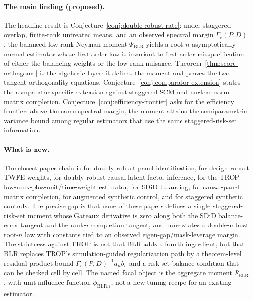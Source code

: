 \documentclass[11pt]{article}
\theoremstyle{definition}
\theoremstyle{plain}
\theoremstyle{remark}
\begin{document}
\paragraph{The main finding (proposed).}
The headline result is Conjecture~\ref{conj:double-robust-rate}: under
staggered overlap, finite-rank untreated means, and an observed spectral
margin $\Gamma_r(P,D)$, the balanced low-rank Neyman moment
$\Psi_{\mathrm{BLR}}$ yields a root-$n$ asymptotically normal estimator whose
first-order law is invariant to first-order misspecification of either the
balancing weights or the low-rank nuisance. Theorem~\ref{thm:score-orthogonal}
is the algebraic layer: it defines the moment and proves the two tangent
orthogonality equations. Conjecture~\ref{conj:comparator-extension} states the
comparator-specific extension against staggered SCM and nuclear-norm matrix
completion. Conjecture~\ref{conj:efficiency-frontier} asks for the efficiency
frontier: above the same spectral margin, the moment attains the semiparametric
variance bound among regular estimators that use the same staggered-risk-set
information.

\paragraph{What is new.}
The closest paper chain is \citet{ArkhangelskyImbens2022} for doubly robust
panel identification, \citet{ArkhangelskyImbensLeiLuo2024} for design-robust
TWFE weights, \citet{AbadieAgarwalDwivediShah2024} for doubly robust causal
latent-factor inference, \citet{AtheyImbensQuViviano2025} for the TROP
low-rank-plus-unit/time-weight estimator, \citet{ArkhangelskyAtheyHirshbergImbensWager2021}
for SDiD balancing, \citet{AtheyBayatiDoudchenkoImbensKhosravi2021} for
causal-panel matrix completion, \citet{BenMichaelFellerRothstein2021} for
augmented synthetic control, and \citet{BenMichaelFellerRothstein2022} for
staggered synthetic controls. The precise gap is that none of these papers
defines a single staggered-risk-set moment whose Gateaux derivative is zero
along both the SDiD balance-error tangent and the rank-$r$ completion tangent,
and none states a double-robust root-$n$ law with constants tied to an observed
eigen-gap/mask-leverage margin. The strictness against TROP is not that BLR
adds a fourth ingredient, but that BLR replaces TROP's simulation-guided
regularization path by a theorem-level residual product bound
$\Gamma_r(P,D)^{-1}a_nb_n$ and a risk-set balance condition that can be checked
cell by cell. The named focal object is the aggregate moment
$\Psi_{\mathrm{BLR}}$, with unit influence function $\phi_{\mathrm{BLR},i}$,
not a new tuning recipe for an existing estimator.
\end{document}
